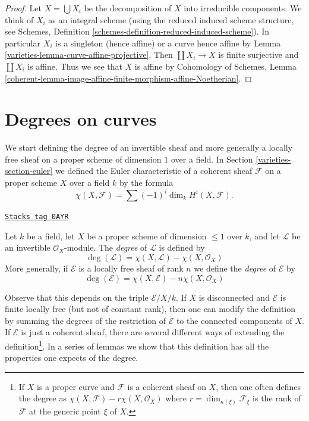 \begin{proof}

Let $X = \bigcup X_i$ be the decomposition of $X$ into irreducible components.
We think of $X_i$ as an integral scheme (using the reduced induced scheme
structure, see Schemes, Definition
\ref{schemes-definition-reduced-induced-scheme}).
In particular $X_i$ is a singleton (hence affine) or a curve
hence affine by Lemma \ref{varieties-lemma-curve-affine-projective}.
Then $\coprod X_i \to X$ is finite surjective and $\coprod X_i$ is affine.
Thus we see that $X$ is affine by
Cohomology of Schemes, Lemma
\ref{coherent-lemma-image-affine-finite-morphism-affine-Noetherian}.
\end{proof}

\section{Degrees on curves}
\label{varieties-section-divisors-curves}
We start defining the degree of an invertible sheaf and more generally
a locally free sheaf on a proper scheme
of dimension $1$ over a field. In Section \ref{varieties-section-euler}
we defined the Euler characteristic
of a coherent sheaf $\mathcal{F}$ on a proper scheme $X$ over a field
$k$ by the formula
$$
\chi(X, \mathcal{F}) = \sum (-1)^i \dim_k H^i(X, \mathcal{F}).
$$

\begin{definition}
\label{varieties-definition-degree-invertible-sheaf}
\href{https://stacks.math.columbia.edu/tag/0AYR}{\texttt{Stacks tag 0AYR}}

Let $k$ be a field, let $X$ be a proper scheme of dimension $\leq 1$
over $k$, and let $\mathcal{L}$ be an invertible $\mathcal{O}_X$-module.
The {\it degree} of $\mathcal{L}$ is defined by
$$
\deg(\mathcal{L}) = \chi(X, \mathcal{L}) - \chi(X, \mathcal{O}_X)
$$
More generally, if $\mathcal{E}$ is a locally free sheaf of rank $n$
we define the {\it degree} of $\mathcal{E}$ by
$$
\deg(\mathcal{E}) = \chi(X, \mathcal{E}) - n\chi(X, \mathcal{O}_X)
$$
\end{definition}

Observe that this depends on the triple $\mathcal{E}/X/k$.
If $X$ is disconnected and $\mathcal{E}$ is finite locally free (but not
of constant rank), then one can modify the definition by summing the degrees
of the restriction of $\mathcal{E}$ to the connected components of $X$.
If $\mathcal{E}$ is just a coherent sheaf, there are several different
ways of extending the definition\footnote{If $X$ is a proper curve
and $\mathcal{F}$ is a coherent sheaf on $X$, then one often defines
the degree as $\chi(X, \mathcal{F}) - r\chi(X, \mathcal{O}_X)$
where $r = \dim_{\kappa(\xi)} \mathcal{F}_\xi$ is the rank of $\mathcal{F}$
at the generic point $\xi$ of $X$.}.
In a series of lemmas we show that this definition has all the properties
one expects of the degree.

